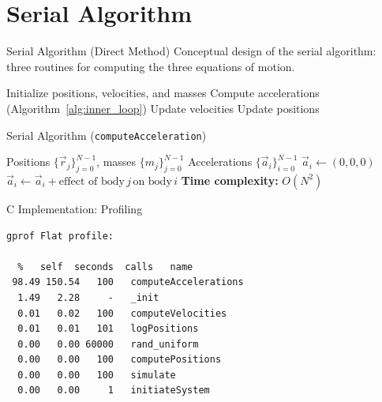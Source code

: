 \documentclass{beamer}
\begin{document}
\section{Serial Algorithm}
\begin{frame}{Serial Algorithm (Direct Method)}
Conceptual design of the serial algorithm:
three routines for computing the three equations of motion.
\begin{algorithm}[H]
\caption{Serial N-body algorithm (direct method)}
\label{alg:serial}
\begin{algorithmic}[1]
\State Initialize positions, velocities, and masses
    \State Compute accelerations (Algorithm~\ref{alg:inner_loop})
    \State Update velocities
    \State Update positions
\EndFor
\end{algorithmic}
\end{algorithm}
\end{frame}

\begin{frame}{Serial Algorithm (\texttt{computeAcceleration})}
\begin{algorithm}[H]
\caption{Inner loop: compute accelerations (direct method)}
\label{alg:inner_loop}
\begin{algorithmic}[1]
\Require Positions $\{\vec r_j\}_{j=0}^{N-1}$, masses $\{m_j\}_{j=0}^{N-1}$
\Ensure Accelerations $\{\vec a_i\}_{i=0}^{N-1}$
  \State $\vec a_i \gets (0,0,0)$
      \State $\vec a_i \gets \vec a_i + \text{effect of body}\, j \, \text{on body}\, i$
    \EndIf
  \EndFor
\EndFor
\Statex \textbf{Time complexity:} $O(N^2)$
\end{algorithmic}
\end{algorithm}
\end{frame}





\begin{frame}[fragile]{C Implementation: Profiling}
\centering

\begin{verbatim}
gprof Flat profile:

  %   self  seconds  calls   name
 98.49 150.54   100   computeAccelerations
  1.49   2.28     -   _init
  0.01   0.02   100   computeVelocities
  0.01   0.01   101   logPositions
  0.00   0.00 60000   rand_uniform
  0.00   0.00   100   computePositions
  0.00   0.00   100   simulate
  0.00   0.00     1   initiateSystem
\end{verbatim}

\end{frame}
\end{document}
